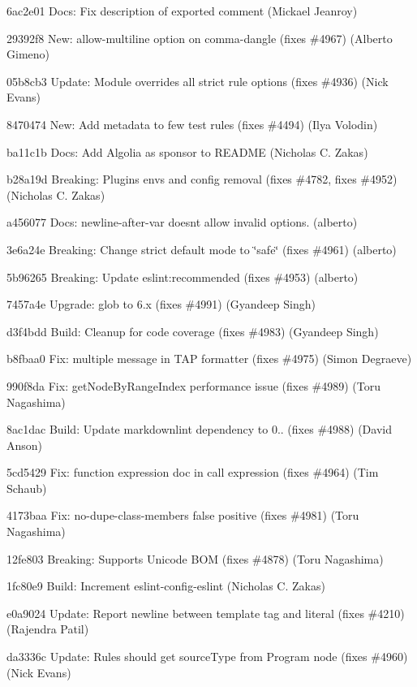 \begin{DoxyItemize}
\item 6ac2e01 Docs\+: Fix description of exported comment (Mickael Jeanroy)
\item 29392f8 New\+: allow-\/multiline option on comma-\/dangle (fixes \#4967) (Alberto Gimeno)
\item 05b8cb3 Update\+: Module overrides all \textquotesingle{}strict\textquotesingle{} rule options (fixes \#4936) (Nick Evans)
\item 8470474 New\+: Add metadata to few test rules (fixes \#4494) (Ilya Volodin)
\item ba11c1b Docs\+: Add Algolia as sponsor to R\+E\+A\+D\+ME (Nicholas C. Zakas)
\item b28a19d Breaking\+: Plugins envs and config removal (fixes \#4782, fixes \#4952) (Nicholas C. Zakas)
\item a456077 Docs\+: newline-\/after-\/var doesn\textquotesingle{}t allow invalid options. (alberto)
\item 3e6a24e Breaking\+: Change {\ttfamily strict} default mode to \char`\"{}safe\char`\"{} (fixes \#4961) (alberto)
\item 5b96265 Breaking\+: Update eslint\+:recommended (fixes \#4953) (alberto)
\item 7457a4e Upgrade\+: glob to 6.\+x (fixes \#4991) (Gyandeep Singh)
\item d3f4bdd Build\+: Cleanup for code coverage (fixes \#4983) (Gyandeep Singh)
\item b8fbaa0 Fix\+: multiple message in T\+AP formatter (fixes \#4975) (Simon Degraeve)
\item 990f8da Fix\+: {\ttfamily get\+Node\+By\+Range\+Index} performance issue (fixes \#4989) (Toru Nagashima)
\item 8ac1dac Build\+: Update markdownlint dependency to 0.. (fixes \#4988) (David Anson)
\item 5cd5429 Fix\+: function expression doc in call expression (fixes \#4964) (Tim Schaub)
\item 4173baa Fix\+: {\ttfamily no-\/dupe-\/class-\/members} false positive (fixes \#4981) (Toru Nagashima)
\item 12fe803 Breaking\+: Supports Unicode B\+OM (fixes \#4878) (Toru Nagashima)
\item 1fc80e9 Build\+: Increment eslint-\/config-\/eslint (Nicholas C. Zakas)
\item e0a9024 Update\+: Report newline between template tag and literal (fixes \#4210) (Rajendra Patil)
\item da3336c Update\+: Rules should get {\ttfamily source\+Type} from Program node (fixes \#4960) (Nick Evans)

\end{DoxyItemize}
